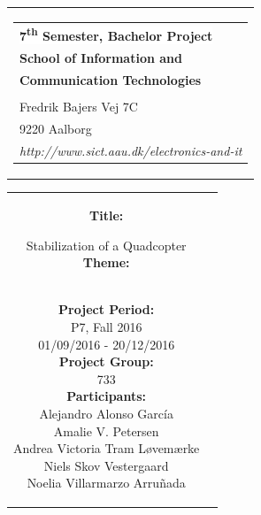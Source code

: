 % 
\begin{nopagebreak}
{\samepage 

\begin{tabular}{r}
\parbox{\textwidth}{  
\hfill \hspace{2cm} \parbox{8cm}{\begin{tabular}{l} %
{\small \textbf{\textcolor{aaublue}{\colorbox{white}{7\textsuperscript{th} Semester, Bachelor Project}}}}\\
{\small \textbf{\textcolor{aaublue}{School of Information and}}}\\
{\small \textbf{\textcolor{aaublue}{Communication Technologies}}}\\ 
{\small \textbf{\textcolor{aaublue}{}}}\\
{\small \textcolor{aaublue}{Fredrik Bajers Vej 7C}} \\
{\small \textcolor{aaublue}{9220 Aalborg}} \\
{\small \textcolor{aaublue}{\emph{http://www.sict.aau.dk/electronics-and-it}}}
\end{tabular}}}
\end{tabular}

\begin{tabular}{cc}
\parbox{7cm}{

\textbf{Title:}

Stabilization of a Quadcopter \\

\textbf{Theme:} \\
\small{
\\
}


\parbox{8cm}{


\textbf{Project Period:}\\
P7, Fall 2016\\
01/09/2016 - 20/12/2016\\
   
\textbf{Project Group:}\\
733\\ %
  
\textbf{Participants:}\\
Alejandro Alonso García\\
Amalie V. Petersen\\
Andrea Victoria Tram Løvemærke\\
Niels Skov Vestergaard\\
Noelia Villarmarzo Arruñada\\

}}
\end{tabular}}
\end{nopagebreak}
